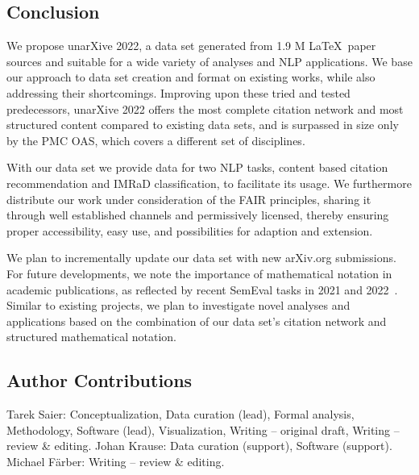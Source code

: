 \subsection{Conclusion}
We propose unarXive 2022, a data set generated from 1.9 M \LaTeX\ paper sources and suitable for a wide variety of analyses and NLP applications. We base our approach to data set creation and format on existing works, while also addressing their shortcomings. Improving upon these tried and tested predecessors, unarXive 2022 offers the most complete citation network and most structured content compared to existing data sets, and is surpassed in size only by the PMC OAS, which covers a different set of disciplines.

With our data set we provide data for two NLP tasks, content based citation recommendation and IMRaD classification, to facilitate its usage. We furthermore distribute our work under consideration of the FAIR principles, sharing it through well established channels and permissively licensed, thereby ensuring proper accessibility, easy use, and possibilities for adaption and extension.

We plan to incrementally update our data set with new arXiv.org submissions. For future developments, we note the importance of mathematical notation in academic publications, as reflected by recent SemEval tasks in 2021 and 2022~\cite{semeval21_task8,semeval22_task12}. Similar to existing projects, we plan to investigate novel analyses and applications based on the combination of our data set's citation network and structured mathematical notation.





\subsection{Author Contributions}  %
Tarek Saier: Conceptualization, Data curation (lead), Formal analysis, Methodology, Software (lead), Visualization, Writing -- original draft, Writing -- review \& editing. Johan Krause: Data curation (support), Software (support). Michael F{\"a}rber: Writing -- review \& editing.


